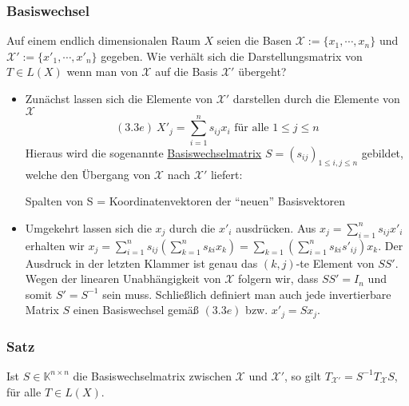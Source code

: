 \subsubsection{Basiswechsel}
Auf einem endlich dimensionalen Raum $X$ seien die Basen $\mathcal{X}:=\{x_1,\cdots ,x_n\}$ und $\mathcal{X}':=\{x'_1,\cdots ,x'_n\}$ gegeben.  Wie verhält sich die Darstellungsmatrix von $T\in L(X)$ wenn man von $\mathcal{X}$ auf die Basis $\mathcal{X}'$ übergeht?
\begin{itemize}
\item Zunächst lassen sich die Elemente von $\mathcal{X}'$ darstellen durch die Elemente von $\mathcal{X}$
\[(3.3e)\ X'_j=\sum _{i=1}^ns_{ij}x_i\text{ für alle } 1\leq j\leq n\]
Hieraus wird die sogenannte \underline{Basiswechselmatrix} $S=(s_{ij})_{1\leq i,j\leq n}$ gebildet, welche den Übergang von $\mathcal{X}$ nach $\mathcal{X}'$ liefert:
\begin{center}
Spalten von S = Koordinatenvektoren der "`neuen"' Basisvektoren
\end{center}
\item Umgekehrt lassen sich die $x_j$ durch die $x'_i$ ausdrücken.  Aus $x_j=\sum _{i=1}^ns_{ij}x'_i$ erhalten wir $x_j=\sum _{i=1}^ns_{ij}(\sum _{k=1}^n s_{ki}x_k)=\sum _{k=1}(\sum _{i=1}^n s_{ki}s'_{ij})x_k$. Der Ausdruck in der letzten Klammer ist genau das $(k,j)$-te Element von $SS'$.  Wegen der linearen Unabhängigkeit von $\mathcal{X}$ folgern wir, dass $SS'=I_n$ und somit $S'=S^{-1}$ sein muss.  Schließlich definiert man auch jede invertierbare Matrix $S$ einen Basiswechsel gemäß $(3.3e)$ bzw. $x'_j=Sx_j$.
\end{itemize}
\addtocounter{subsubsection}{12}
\subsubsection{Satz}
Ist $S\in \mathbb{K}^{n\times n}$ die Basiswechselmatrix zwischen $\mathcal{X}$ und $\mathcal{X}'$, so gilt $T_{\mathcal{X}'}=S^{-1}T_\mathcal{X}S$, für alle $T\in L(X)$.

